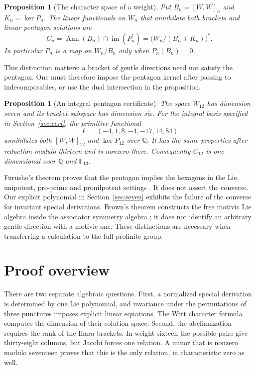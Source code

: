 \documentclass[11pt]{article}
\newcommand{\F}{\mathbb F}
\newcommand{\Q}{\mathbb Q}
\newcommand{\Ann}{\operatorname{Ann}}
\newcommand{\im}{\operatorname{im}}
\newtheorem{proposition}[theorem]{Proposition}
\theoremstyle{definition}
\theoremstyle{remark}
\begin{document}
\begin{proposition}[The character space of a weight]\label{prop:dual}
Put $B_n=[W,W]_n$ and $K_n=\ker P_n$.  The linear functionals on $W_n$
that annihilate both brackets and linear pentagon solutions are
\[
 C_n=\Ann(B_n)\cap\im(P_n^*)
     =\bigl(W_n/(B_n+K_n)\bigr)^*.
\]
In particular $P_n$ is a map on $W_n/B_n$ only when $P_n(B_n)=0$.
\end{proposition}

This distinction matters: a bracket of gentle directions need not satisfy
the pentagon.  One must therefore impose the pentagon kernel after passing
to indecomposables, or use the dual intersection in the proposition.

\begin{proposition}[An integral pentagon certificate]\label{prop:weight12}
The space $W_{12}$ has dimension seven and its bracket subspace has
dimension six.  For the integral basis specified in Section~\ref{sec:cert},
the primitive functional
\[
\ell=(-4,1,8,-4,-17,14,84)
\]
annihilates both $[W,W]_{12}$ and $\ker P_{12}$ over $\Q$.
It has the same properties after reduction modulo thirteen and is nonzero
there.  Consequently $C_{12}$ is one-dimensional over $\Q$ and $\F_{13}$.
\end{proposition}

Furusho's theorem proves that the pentagon implies the hexagons in the
Lie, unipotent, pro-prime and pronilpotent settings
\cite[Theorems 1--3 and the two corollaries in \S3]{Furusho}.
It does not assert the converse.
Our explicit polynomial in Section~\ref{sec:seven} exhibits the failure
of the converse for invariant special derivations.  Brown's theorem
constructs the free motivic Lie algebra inside the associator symmetry
algebra \cite[Theorem 1.1 and its consequence, \S1.1]{Brown}; it does not identify an arbitrary gentle
direction with a motivic one.  These distinctions are necessary when
transferring a calculation to the full profinite group.

\section{Proof overview}
There are two separate algebraic questions.  First, a normalized special
derivation is determined by one Lie polynomial, and invariance under the
permutations of three punctures imposes explicit linear equations.  The
Witt character formula computes the dimension of their solution space.
Second, the abelianization requires the rank of the Ihara brackets.  In
weight sixteen the possible pairs give thirty-eight columns, but Jacobi
forces one relation.  A minor that is nonzero modulo seventeen proves
that this is the only relation, in characteristic zero as well.
\end{document}
